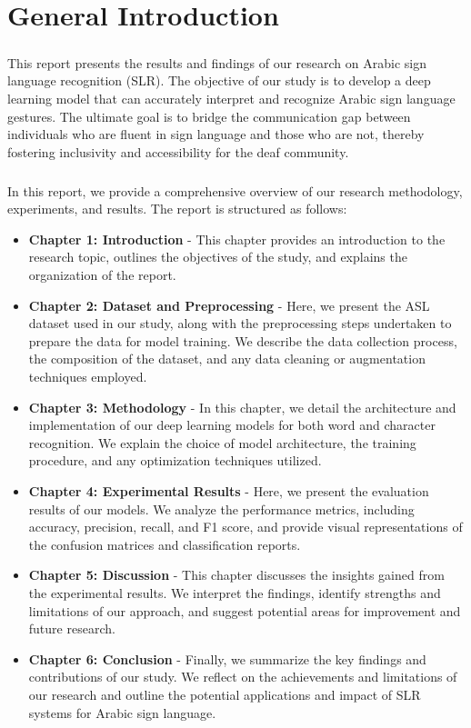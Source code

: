 \chapter*{General Introduction}
\paragraph{}
This report presents the results and findings of our research on Arabic sign language recognition (SLR). The objective of our study is to develop a deep learning model that can accurately interpret and recognize Arabic sign language gestures. The ultimate goal is to bridge the communication gap between individuals who are fluent in sign language and those who are not, thereby fostering inclusivity and accessibility for the deaf community.
\paragraph{}
In this report, we provide a comprehensive overview of our research methodology, experiments, and results. The report is structured as follows:
\begin{itemize}
	\item \textbf{Chapter 1: Introduction} - This chapter provides an introduction to the research topic, outlines the objectives of the study, and explains the organization of the report.
	
	\item \textbf{Chapter 2: Dataset and Preprocessing} - Here, we present the ASL dataset used in our study, along with the preprocessing steps undertaken to prepare the data for model training. We describe the data collection process, the composition of the dataset, and any data cleaning or augmentation techniques employed.
	
	\item \textbf{Chapter 3: Methodology} - In this chapter, we detail the architecture and implementation of our deep learning models for both word and character recognition. We explain the choice of model architecture, the training procedure, and any optimization techniques utilized.
	
	\item \textbf{Chapter 4: Experimental Results} - Here, we present the evaluation results of our models. We analyze the performance metrics, including accuracy, precision, recall, and F1 score, and provide visual representations of the confusion matrices and classification reports.
	
	\item \textbf{Chapter 5: Discussion} - This chapter discusses the insights gained from the experimental results. We interpret the findings, identify strengths and limitations of our approach, and suggest potential areas for improvement and future research.
	
	\item \textbf{Chapter 6: Conclusion} - Finally, we summarize the key findings and contributions of our study. We reflect on the achievements and limitations of our research and outline the potential applications and impact of SLR systems for Arabic sign language.
\end{itemize}
